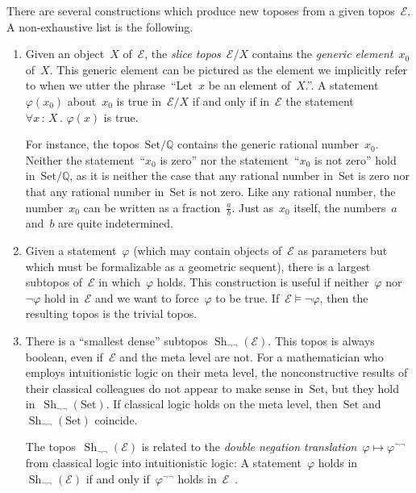 \documentclass[oneside,reqno]{amsart}
\theoremstyle{definition}
\theoremstyle{plain}
\theoremstyle{remark}
\newcommand{\E}{\mathcal{E}}
\newcommand{\QQ}{\mathbb{Q}}
\DeclareMathOperator{\Sh}{Sh}
\newcommand{\Set}{\mathrm{Set}}
\renewcommand{\_}{\mathpunct{.}\,}
\newcommand{\?}{\,{:}\,}
\begin{document}
There are several constructions which produce new toposes from a given
topos~$\E$. A non-exhaustive list is the following.
\begin{enumerate}
\item Given an object~$X$ of~$\E$, the \emph{slice topos}~$\E/X$
contains the \emph{generic element}~$x_0$ of~$X$. This generic element can be
pictured as the element we implicitly refer to when we utter the
phrase~``Let~$x$ be an element of~$X$.''. A statement~$\varphi(x_0)$
about~$x_0$ is true in~$\E/X$ if and only if in~$\E$ the statement~$\forall x
\? X\_ \varphi(x)$ is true.

For instance, the topos~$\Set/\QQ$ contains the generic rational number~$x_0$.
Neither the statement~``$x_0$ is zero'' nor the statement~``$x_0$ is not zero''
hold in~$\Set/\QQ$, as it is neither the case that any rational number
in~$\Set$ is zero nor that any rational number in~$\Set$ is not zero. Like any
rational number, the number~$x_0$ can be written as a fraction~$\frac{a}{b}$.
Just as~$x_0$ itself, the numbers~$a$ and~$b$ are quite indetermined.
\item Given a statement~$\varphi$ (which may contain objects of~$\E$ as
parameters but which must be formalizable as a geometric sequent), there is a
largest subtopos of~$\E$ in which~$\varphi$ holds. This construction is useful
if neither~$\varphi$ nor~$\neg\varphi$ hold in~$\E$ and we want to
force~$\varphi$ to be true. If~$\E \models \neg\varphi$, then the resulting
topos is the trivial topos.
\item There is a ``smallest dense'' subtopos $\Sh_{\neg\neg}(\E)$. This topos
is always boolean, even if~$\E$ and the meta level are not. For a mathematician who employs
intuitionistic logic on their meta level, the nonconstructive results of their
classical colleagues do not appear to make sense in~$\Set$, but they hold
in~$\Sh_{\neg\neg}(\Set)$. If classical logic holds on the meta level,
then~$\Set$ and~$\Sh_{\neg\neg}(\Set)$ coincide.

The topos~$\Sh_{\neg\neg}(\E)$ is related to the \emph{double negation
translation}~$\varphi \mapsto \varphi^{\neg\neg}$ from classical logic into
intuitionistic logic: A statement~$\varphi$ holds in~$\Sh_{\neg\neg}(\E)$ if
and only if~$\varphi^{\neg\neg}$ holds
in~$\E$~\cite[Theorem~6.31]{blechschmidt:phd}.
\end{enumerate}
\end{document}
